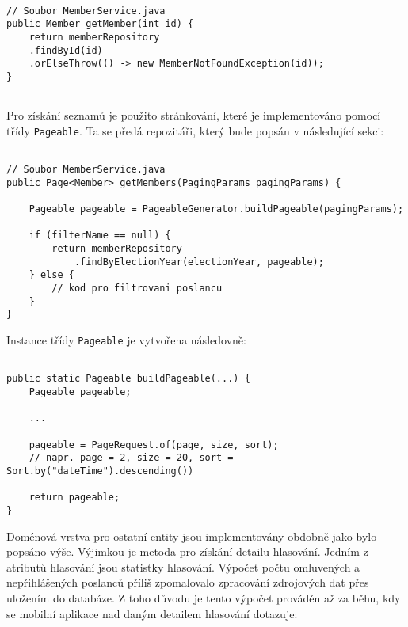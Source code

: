 \begin{lstlisting}[caption={Ukázka kódu pro získání detailu poslance}, label={lst:headers-paging}, tabsize=2]

// Soubor MemberService.java
public Member getMember(int id) {
	return memberRepository
	.findById(id)
	.orElseThrow(() -> new MemberNotFoundException(id));
}
	
\end{lstlisting}

\noindent Pro získání seznamů je použito stránkování, které je implementováno pomocí třídy \lstinline|Pageable|. Ta se předá repozitáři, který bude popsán v následující sekci:

\begin{lstlisting}[caption={Ukázka doménové vrstvy pro vrácení seznamu poslanců}, label={lst:headers-paging}, tabsize=2]

// Soubor MemberService.java
public Page<Member> getMembers(PagingParams pagingParams) {
	
	Pageable pageable = PageableGenerator.buildPageable(pagingParams);
	
	if (filterName == null) {
		return memberRepository
			.findByElectionYear(electionYear, pageable);
	} else {
		// kod pro filtrovani poslancu
	}
}
\end{lstlisting}

\noindent Instance třídy \lstinline|Pageable| je vytvořena následovně:

\begin{lstlisting}[caption={Ukázka kódu pro sestavení objektu pro stránkování}, label={lst:paging-object}, tabsize=2]
	
public static Pageable buildPageable(...) {
	Pageable pageable;
	
	...
	
	pageable = PageRequest.of(page, size, sort);
	// napr. page = 2, size = 20, sort = Sort.by("dateTime").descending())
	
	return pageable;
}

\end{lstlisting}

\noindent Doménová vrstva pro ostatní entity jsou implementovány obdobně jako bylo popsáno výše. Výjimkou je metoda pro získání detailu hlasování. Jedním z atributů hlasování jsou statistky hlasování. Výpočet počtu omluvených a nepřihlášených poslanců příliš zpomalovalo zpracování zdrojových dat přes uložením do databáze. Z toho důvodu je tento výpočet prováděn až za běhu, kdy se mobilní aplikace nad daným detailem hlasování dotazuje:

